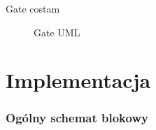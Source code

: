 Gate costam

\begin{figure}[h]
	\caption{\label{fig:subcaption_example}Gate UML}
\end{figure}


\section{Implementacja}

\subsubsection{Ogólny schemat blokowy}
\clearpage

